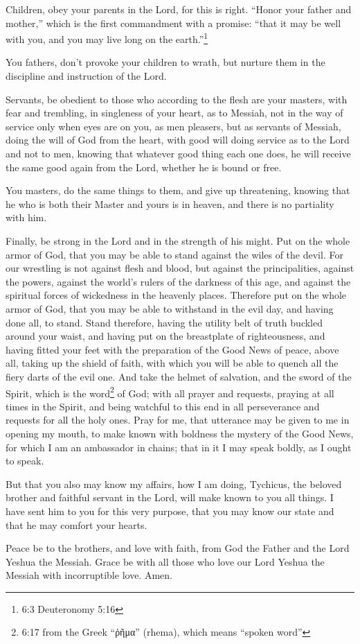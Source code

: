 \mychapter{} \myverse*{}Children, obey your parents in the Lord, for this is right.
\myverse{}“Honor your father and mother,” which is the first commandment with a promise:
\myverse{}“that it may be well with you, and you may live long on the earth.”\footnote{6:3 Deuteronomy 5:16}

\myverse{}You fathers, don’t provoke your children to wrath, but nurture
them in the discipline and instruction of the Lord.

\myverse{}Servants, be obedient to those who according to the flesh are your
masters, with fear and trembling, in singleness of your heart, as to Messiah,
\myverse{}not in the way of service only when eyes are on you, as men pleasers, but as
servants of Messiah, doing the will of God from the heart,
\myverse{}with good will doing service as to the Lord and not to men,
\myverse{}knowing that whatever good thing each one does, he will receive the same good
again from the Lord, whether he is bound or free.

\myverse{}You masters, do the same things to them, and give up threatening,
knowing that he who is both their Master and yours is in heaven, and there is no partiality with him.

\myverse{}Finally, be strong in the Lord and in the strength of his might.
\myverse{}Put on the whole armor of God, that you may be able to stand against the wiles
of the devil.
\myverse{}For our wrestling is not against flesh and blood, but against the principalities,
against the powers, against the world’s rulers of the darkness of this age, and against the spiritual
forces of wickedness in the heavenly places.
\myverse{}Therefore put on the whole armor of God, that you may be able to withstand
in the evil day, and having done all, to stand.
\myverse{}Stand therefore, having the utility belt of truth buckled around your waist,
and having put on the breastplate of righteousness,
\myverse{}and having fitted your feet with the preparation of the Good News of peace,
\myverse{}above all, taking up the shield of faith, with which you will be able to quench
all the fiery darts of the evil one.
\myverse{}And take the helmet of salvation, and the sword of the Spirit, which is the
word\footnote{6:17 from the Greek “ῥῆμα” (rhema), which means “spoken word”} of God;
\myverse{}with all prayer and requests, praying at all times in the Spirit, and being
watchful to this end in all perseverance and requests for all the holy ones.
\myverse{}Pray for me, that utterance may be given to me in opening my mouth, to make
known with boldness the mystery of the Good News,
\myverse{}for which I am an ambassador in chains; that in it I may speak boldly, as
I ought to speak.

\myverse{}But that you also may know my affairs, how I am doing, Tychicus,
the beloved brother and faithful servant in the Lord, will make known to you all things.
\myverse{}I have sent him to you for this very purpose, that you may know our state
and that he may comfort your hearts.

\myverse{}Peace be to the brothers, and love with faith, from God the Father
and the Lord Yeshua the Messiah.
\myverse{}Grace be with all those who love our Lord Yeshua the Messiah with incorruptible
love. Amen.


